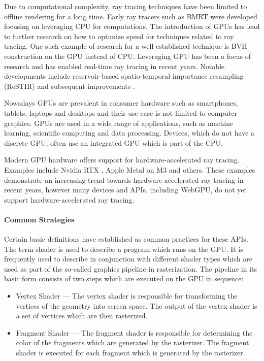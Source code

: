 Due to computational complexity, ray tracing techniques have been limited to offline rendering for a long time. Early ray tracers such as \gls{BMRT} were developed focusing on leveraging \gls{CPU} for computations. The introduction of \glspl{GPU} has lead to further research on how to optimize speed for techniques related to ray tracing. One such example of research for a well-established technique is \gls{BVH} construction on the \gls{GPU} \cite{lauterbach2009GPUbvh} instead of \gls{CPU}. Leveraging \gls{GPU} has been a focus of research and has enabled real-time ray tracing in recent years. Notable developments include reservoir-based spatio-temporal importance resampling (ReSTIR) \cite{restir} and subsequent improvements \cite{restirAdvancements,restirGeneralized}.

Nowadays GPUs are prevalent in consumer hardware such as smartphones, tablets, laptops and desktops and their use case is not limited to computer graphics. GPUs are used in a wide range of applications, such as machine learning, scientific computing and data processing. Devices, which do not have a discrete GPU, often use an integrated GPU which is part of the CPU.

Modern GPU hardware offers support for hardware-accelerated ray tracing. Examples include Nvidia RTX \cite{nvidiaRtxRayTracing}, Apple Metal on M3 \cite{appleM3GpuAdvancements} and others. These examples demonstrate an increasing trend towards hardware-accelerated ray tracing in recent years, however many devices and \glspl{API}, including WebGPU, do not yet support hardware-accelerated ray tracing.

\paragraph{Common Strategies}

Certain basic definitions have established as common practices for these \glspl{API}. The term shader is used to describe a program which runs on the \gls{GPU}. It is frequently used to describe in conjunction with different shader types which are used as part of the so-called graphics pipeline in rasterization. The pipeline in its basic form consists of two steps which are executed on the \gls{GPU} in sequence:

\begin{itemize}
    \item{Vertex Shader} — The vertex shader is responsible for transforming the vertices of the geometry into screen space. The output of the vertex shader is a set of vertices which are then rasterized.
    \item{Fragment Shader} — The fragment shader is responsible for determining the color of the fragments which are generated by the rasterizer. The fragment shader is executed for each fragment which is generated by the rasterizer.
\end{itemize}

